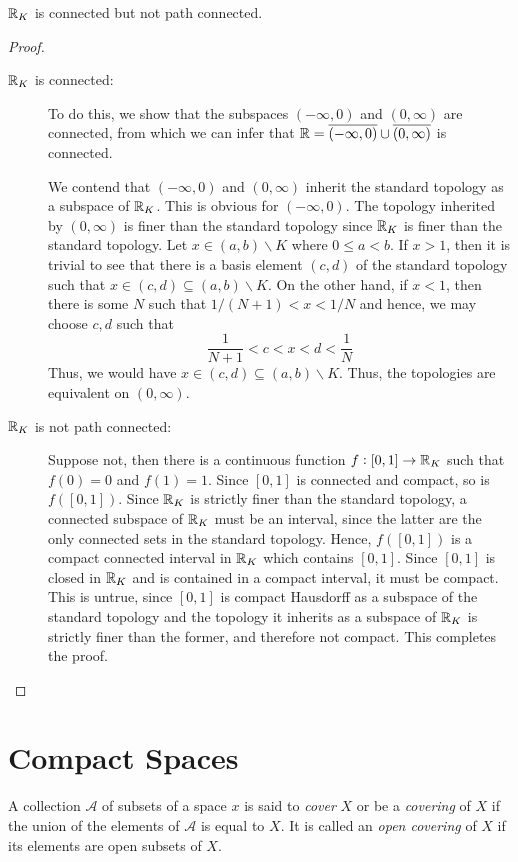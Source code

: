 \begin{example}
    $\mathbb{R}_K$ is connected but not path connected.
\end{example}
\begin{proof}
\begin{description}
\item[$\mathbb{R}_K$ is connected: ] 
    To do this, we show that the subspaces $(-\infty, 0)$ and $(0,\infty)$ are connected, from which we can infer that $\mathbb{R} = \overline{(-\infty, 0)}\cup\overline{(0,\infty)}$ is connected.

    We contend that $(-\infty, 0)$ and $(0,\infty)$ inherit the standard topology as a subspace of $\mathbb{R}_K$. This is obvious for $(-\infty, 0)$. The topology inherited by $(0,\infty)$ is finer than the standard topology since $\mathbb{R}_K$ is finer than the standard topology. Let $x\in (a,b)\backslash K$ where $0\le a < b$. If $x > 1$, then it is trivial to see that there is a basis element $(c,d)$ of the standard topology such that $x\in (c,d)\subseteq(a,b)\backslash K$. On the other hand, if $x < 1$, then there is some $N$ such that $1/(N + 1) < x < 1/N$ and hence, we may choose $c,d$ such that 
    \begin{equation*}
        \frac{1}{N + 1} < c < x < d < \frac{1}{N}
    \end{equation*}
    Thus, we would have $x\in (c,d)\subseteq (a,b)\backslash K$. Thus, the topologies are equivalent on $(0,\infty)$.

\item[$\mathbb{R}_K$ is not path connected: ] Suppose not, then there is a continuous function $f: [0,1]\to\mathbb{R}_K$ such that $f(0) = 0$ and $f(1) = 1$. Since $[0,1]$ is connected and compact, so is $f([0,1])$. Since $\mathbb{R}_K$ is strictly finer than the standard topology, a connected subspace of $\mathbb{R}_K$ must be an interval, since the latter are the only connected sets in the standard topology. Hence, $f([0,1])$ is a compact connected interval in $\mathbb{R}_K$ which contains $[0,1]$. Since $[0,1]$ is closed in $\mathbb{R}_K$ and is contained in a compact interval, it must be compact. This is untrue, since $[0,1]$ is compact Hausdorff as a subspace of the standard topology and the topology it inherits as a subspace of $\mathbb{R}_K$ is strictly finer than the former, and therefore not compact. This completes the proof.
\end{description}
\end{proof}

\section{Compact Spaces}
\begin{definition}[Cover]
    A collection $\mathscr{A}$ of subsets of a space $x$ is said to \textit{cover} $X$ or be a \textit{covering} of $X$ if the union of the elements of $\mathscr{A}$ is equal to $X$. It is called an \textit{open covering} of $X$ if its elements are open subsets of $X$.
\end{definition}

